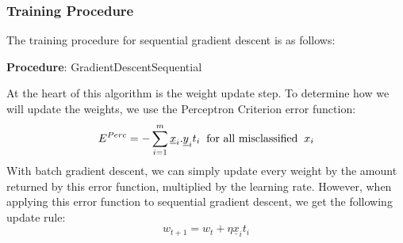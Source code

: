\documentclass{article}
\begin{document}
\subsubsection*{Training Procedure}
The training procedure for sequential gradient descent is as follows: \\

\begin{algorithm}[H]{\textbf{Procedure}: GradientDescentSequential} \\
    \SetAlgoLined
\end{algorithm}
\vspace{4mm}

\noindent At the heart of this algorithm is the weight update step. To determine how we will update the weights, we use the Perceptron Criterion error function:
\[E^{Perc} = -\sum_{i = 1}^{m} \underline{x}_{i} . \underline{y}_{i} t_{i} \hspace{2mm} \textrm{for all misclassified} \hspace{2mm} x_{i}\]
With batch gradient descent, we can simply update every weight by the amount returned by this error function, multiplied by the learning rate. However, when applying this error function to sequential gradient descent, we get the following update rule:
\[w_{t+1} = w_{t} + \eta \underline{x}_{i} t_{i}\]
\end{document}
